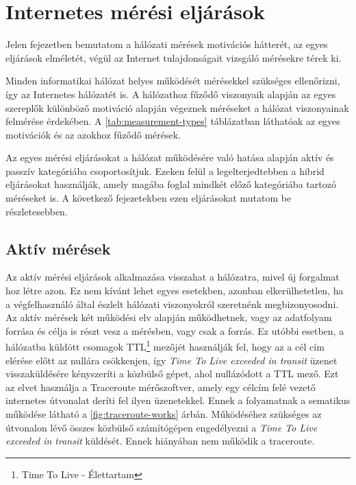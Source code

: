 
\section{Internetes mérési eljárások}
 
 

Jelen fejezetben bemutatom a hálózati mérések motivációs hátterét, az egyes eljárások elméletét, végül az Internet tulajdonságait vizsgáló mérésekre térek ki.

Minden informatikai hálózat helyes működését mérésekkel szükséges ellenőrizni, így az Internetes hálózatét is. A hálózathoz fűződő viszonyaik alapján az egyes szereplők különböző motiváció alapján végeznek méréseket a hálózat viszonyainak felmérése érdekében. A \ref{tab:measurement-types} táblázatban\cite{networkMeasure} láthatóak az egyes motivációk és az azokhoz fűződő mérések. 



Az egyes mérési eljárásokat a hálózat működésére való hatása alapján aktív és passzív kategóriába csoportosítjuk. Ezeken felül a legelterjedtebben a hibrid eljárásokat használják, amely magába foglal mindkét előző kategóriába tartozó méréseket is. A következő fejezetekben ezen eljárásokat mutatom be részletesebben.

\subsection{Aktív mérések}

Az aktív mérési eljárások alkalmazása visszahat a hálózatra, mivel új forgalmat hoz létre azon. Ez nem kívánt lehet egyes esetekben, azonban elkerülhetetlen, ha a végfelhasználó által észlelt hálózati viszonyokról szeretnénk megbizonyosodni.
Az aktív mérések két működési elv alapján működhetnek, vagy az adatfolyam forrása és célja is részt vesz a mérésben, vagy csak a forrás. Ez utóbbi esetben, a hálózatba küldött csomagok TTL\footnote{Time To Live - Élettartam} mezőjét használják fel, hogy az a cél cím elérése előtt az nullára csökkenjen, így \textit{Time To Live exceeded in transit} üzenet visszaküldésére kényszeríti a közbülső gépet, ahol nullázódott a TTL mező. Ezt az elvet használja a Traceroute mérőszoftver, amely egy célcím felé vezető internetes útvonalat deríti fel ilyen üzenetekkel. Ennek a folyamatnak a sematikus működése látható a \ref{fig:traceroute-works} árbán. Működéséhez szükséges az útvonalon lévő összes közbülső számítógépen engedélyezni a \textit{Time To Live exceeded in transit} küldését. Ennek hiányában nem működik a traceroute.

